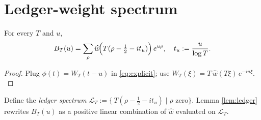 \section{Ledger-weight spectrum}\label{RH:ledger}

\begin{lemma}\label{lem:ledger}
For every $T$ and $u$,
\[
B_T(u)=\sum_{\rho}
        \widehat w\!\Bigl(T(\rho-\tfrac12-it_u)\Bigr)\,e^{u\rho},
\quad t_u:=\frac{u}{\log T}.
\]
\end{lemma}

\begin{proof}
Plug $\phi(t)=W_T(t-u)$ in \eqref{eq:explicit}; use
$\widehat{W_T}(\xi)=T\,\widehat w(T\xi)\,e^{-iu\xi}.$
\end{proof}

Define the \emph{ledger spectrum}
\(
\mathcal L_T:=\{\,T(\rho-\tfrac12-i t_u)\mid \rho\text{ zero}\}.
\)
Lemma \ref{lem:ledger} rewrites $B_T(u)$ as a positive linear combination
of $\widehat w$ evaluated on $\mathcal L_T$. 